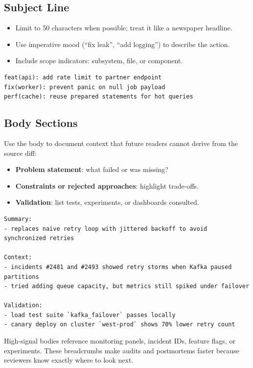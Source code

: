 \subsection{Subject Line}
\begin{itemize}
  \item Limit to 50 characters when possible; treat it like a newspaper headline.
  \item Use imperative mood (``fix leak'', ``add logging'') to describe the action.
  \item Include scope indicators: subsystem, file, or component.
\end{itemize}

\begin{lstlisting}[style=markdown,caption={Subject line patterns}]
feat(api): add rate limit to partner endpoint
fix(worker): prevent panic on null job payload
perf(cache): reuse prepared statements for hot queries
\end{lstlisting}

\subsection{Body Sections}
Use the body to document context that future readers cannot derive from the source diff:
\begin{itemize}
  \item \textbf{Problem statement}: what failed or was missing?
  \item \textbf{Constraints or rejected approaches}: highlight trade-offs.
  \item \textbf{Validation}: list tests, experiments, or dashboards consulted.
\end{itemize}

\begin{lstlisting}[style=markdown,caption={Template for detailed commit bodies}]
Summary:
- replaces naive retry loop with jittered backoff to avoid synchronized retries

Context:
- incidents #2481 and #2493 showed retry storms when Kafka paused partitions
- tried adding queue capacity, but metrics still spiked under failover

Validation:
- load test suite `kafka_failover` passes locally
- canary deploy on cluster `west-prod` shows 70% lower retry count
\end{lstlisting}

\begin{tipbox}
High-signal bodies reference monitoring panels, incident IDs, feature flags, or experiments. These breadcrumbs make audits and postmortems faster because reviewers know exactly where to look next.
\end{tipbox}

